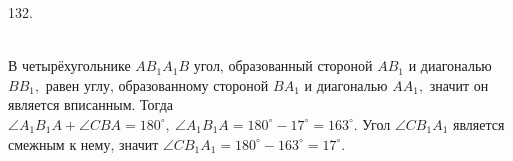 132. \begin{figure}[ht!]
\end{figure}\\
В четырёхугольнике $AB_1A_1B$ угол, образованный стороной $AB_1$ и диагональю $BB_1,$ равен углу, образованному стороной $BA_1$ и диагональю $AA_1,$ значит он является вписанным. Тогда $\angle A_1B_1A+\angle CBA=180^\circ,\ \angle A_1B_1A=180^\circ-17^\circ=163^\circ.$ Угол $\angle CB_1A_1$ является смежным к нему, значит $\angle CB_1A_1=180^\circ-163^\circ=17^\circ.$\\
